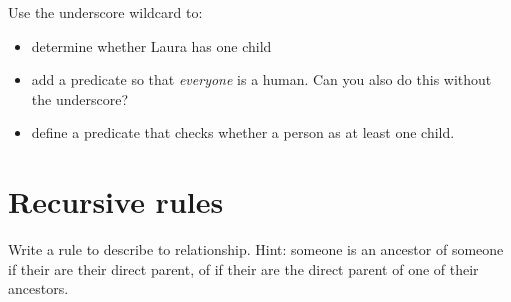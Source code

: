 \documentclass{../../../tp}
\begin{document}
\begin{instruction}
	Use the underscore wildcard to:
	\begin{itemize}
		\item determine whether Laura has one child
		\item add a  predicate so that \emph{everyone} is a human. Can you also do this without the underscore?
		\item define a  predicate that checks whether a person as at least one child. 
	\end{itemize}
\end{instruction} 


\section{Recursive rules}

\begin{instruction}
	Write a rule to describe to  relationship. Hint: someone is an ancestor of someone if their are their direct parent, of if their are the direct parent of one of their ancestors.
\end{instruction}
\end{document}
